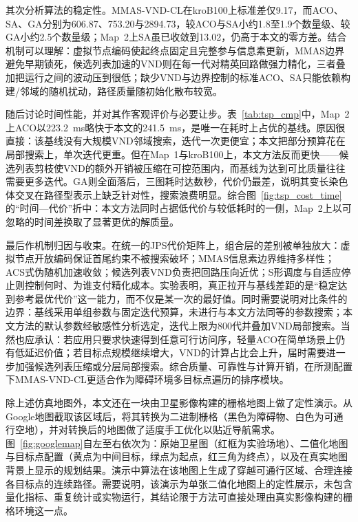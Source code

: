 \documentclass[lettersize,journal]{IEEEtran}
\begin{document}
其次分析算法的稳定性。MMAS-VND-CL在kroB100上标准差仅9.17，而ACO、SA、GA分别为606.87、753.20与2894.73，较ACO与SA小约1.8至1.9个数量级、较GA小约2.5个数量级；Map~2上SA虽已收敛到13.02，仍高于本文的零方差。结合机制可以理解：虚拟节点编码使起终点固定且完整参与信息素更新，MMAS边界避免早期锁死，候选列表加速的VND则在每一代对精英回路做强力精化，三者叠加把运行之间的波动压到很低；缺少VND与边界控制的标准ACO、SA只能依赖构建/邻域的随机扰动，路径质量随初始化散布较宽。

随后讨论时间性能，并对其作客观评价与必要让步。表~\textcolor{blue}{\ref{tab:tsp_cmp}}中，Map~2上ACO以223.2~ms略快于本文的241.5~ms，是唯一在耗时上占优的基线。原因很直接：该基线没有大规模VND邻域搜索，迭代一次更便宜；本文把部分预算花在局部搜索上，单次迭代更重。但在Map~1与kroB100上，本文方法反而更快——候选列表剪枝使VND的额外开销被压缩在可控范围内，而基线为达到可比质量往往需要更多迭代。GA则全面落后，三图耗时达数秒，代价仍最差，说明其变长染色体交叉在路径型表示上缺乏针对性，搜索浪费明显。综合图~\textcolor{blue}{\ref{fig:tsp_cost_time}}的“时间—代价”折中：本文方法同时占据低代价与较低耗时的一侧，Map~2上以可忽略的时间差换取了显著更优的解质量。

最后作机制归因与收束。在统一的JPS代价矩阵上，组合层的差别被单独放大：虚拟节点开放编码保证首尾约束不被搜索破坏；MMAS信息素边界维持多样性；ACS式伪随机加速收敛；候选列表VND负责把回路压向近优；S形调度与自适应停止则控制何时、为谁支付精化成本。实验表明，真正拉开与基线差距的是“稳定达到参考最优代价”这一能力，而不仅是某一次的最好值。同时需要说明对比条件的边界：基线采用单组参数与固定迭代预算，未进行与本文方法同等的参数搜索；本文方法的默认参数经敏感性分析选定，迭代上限为800代并叠加VND局部搜索。当然也应承认：若应用只要求快速得到任意可行访问序，轻量ACO在简单场景上仍有低延迟价值；若目标点规模继续增大，VND的计算占比会上升，届时需要进一步加强候选列表压缩或分层局部搜索。综合质量、可靠性与计算开销，在所测配置下MMAS-VND-CL更适合作为障碍环境多目标点遍历的排序模块。

除上述仿真地图外，本文还在一块由卫星影像构建的栅格地图上做了定性演示。从Google地图截取该区域后，将其转换为二进制栅格（黑色为障碍物、白色为可通行空地），并对转换后的地图做了适度手工优化以贴近导航需求。图~\textcolor{blue}{\ref{fig:googlemap}}自左至右依次为：原始卫星图（红框为实验场地）、二值化地图与目标点配置（黄点为中间目标，绿点为起点，红三角为终点），以及在真实地图背景上显示的规划结果。演示中算法在该地图上生成了穿越可通行区域、合理连接各目标点的连续路径。需要说明，该演示为单张二值化地图上的定性展示，未包含量化指标、重复统计或实物运行，其结论限于方法可直接处理由真实影像构建的栅格环境这一点。
\end{document}
